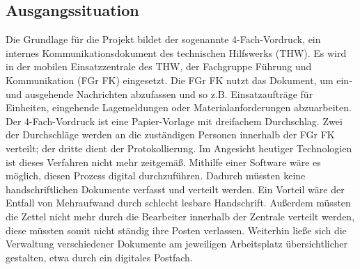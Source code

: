 \subsection{Ausgangssituation}
Die Grundlage für die Projekt bildet der sogenannte 4-Fach-Vordruck, ein internes Kommunikationsdokument des technischen Hilfswerks (THW). Es wird in der mobilen Einsatzzentrale des THW, der Fachgruppe Führung und Kommunikation (FGr FK) eingesetzt. Die FGr FK nutzt das Dokument, um ein- und ausgehende Nachrichten abzufassen und so z.B. Einsatzaufträge für Einheiten, eingehende Lagemeldungen oder Materialanforderungen abzuarbeiten. Der 4-Fach-Vordruck ist eine Papier-Vorlage mit dreifachem Durchschlag. Zwei der Durchschläge werden an die zuständigen Personen innerhalb der FGr FK verteilt; der dritte dient der Protokollierung. Im Angesicht heutiger Technologien ist dieses Verfahren nicht mehr zeitgemäß. Mithilfe einer Software wäre es möglich, diesen Prozess digital durchzuführen. Dadurch müssten keine handschriftlichen Dokumente verfasst und verteilt werden. Ein Vorteil wäre der Entfall von Mehraufwand durch schlecht lesbare Handschrift. Außerdem müssten die Zettel nicht mehr durch die Bearbeiter innerhalb der Zentrale verteilt werden, diese müssten somit nicht ständig ihre Posten verlassen. Weiterhin ließe sich die Verwaltung verschiedener Dokumente am jeweiligen Arbeitsplatz übersichtlicher gestalten, etwa durch ein digitales Postfach.